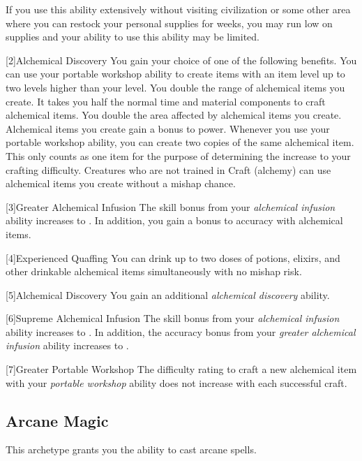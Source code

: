         If you use this ability extensively without visiting civilization or some other area where you can restock your personal supplies for weeks, you may run low on supplies and your ability to use this ability may be limited.

        [2]{Alchemical Discovery} You gain your choice of one of the following benefits.
        {
             You can use your portable workshop ability to create items with an item level up to two levels higher than your level.
             You double the range of alchemical items you create.
             It takes you half the normal time and material components to craft alchemical items.
             You double the area affected by alchemical items you create.
             Alchemical items you create gain a  bonus to power.
             Whenever you use your portable workshop ability, you can create two copies of the same alchemical item.
            This only counts as one item for the purpose of determining the increase to your crafting difficulty.
             Creatures who are not trained in Craft (alchemy) can use alchemical items you create without a mishap chance.
        }

        [3]{Greater Alchemical Infusion} The skill bonus from your \textit{alchemical infusion} ability increases to .
        In addition, you gain a  bonus to accuracy with alchemical items.

        [4]{Experienced Quaffing} You can drink up to two doses of potions, elixirs, and other drinkable alchemical items simultaneously with no mishap risk.

        [5]{Alchemical Discovery} You gain an additional \textit{alchemical discovery} ability.

        [6]{Supreme Alchemical Infusion} The skill bonus from your \textit{alchemical infusion} ability increases to .
        In addition, the accuracy bonus from your \textit{greater alchemical infusion} ability increases to .

        [7]{Greater Portable Workshop} The difficulty rating to craft a new alchemical item with your \textit{portable workshop} ability does not increase with each successful craft.

    \newpage
    \subsection{Arcane Magic}
        This archetype grants you the ability to cast arcane spells.

